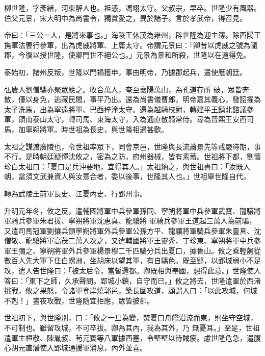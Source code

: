 
\begin{pinyinscope}

 柳世隆，字彥緒，河東解人也。祖憑，馮翊太守。父叔宗，早卒。世隆少有風器。伯父元景，宋大明中為尚書令，獨賞愛之，異於諸子。言於孝武帝，得召見。



 帝曰：「三公一人，是將來事也。」海陵王休茂為雍州，辟世隆為迎主簿。除西陽王撫軍法曹行參軍，出為虎威將軍、上庸太守。帝謂元景曰：「卿昔以虎威之號為隨郡，今復以授世隆，使卿門世不絕公也。」元景為景和所殺，世隆以在遠得免。



 泰始初，諸州反叛，世隆以門禍獲申，事由明帝，乃據郡起兵，遣使應朝廷。



 弘農人劉僧驎亦聚眾應之。收合萬人，奄至襄陽萬山，為孔道存所
 破，眾皆奔散，僅以身免，逃藏民間，事平乃出。還為尚書儀曹郎，明帝嘉其義心，發詔擢為太子洗馬，出為寧遠將軍、巴西梓潼太守。還為越騎校尉，轉建平王鎮北諮議參軍，領南泰山太守，轉司馬、東海太守，入為通直散騎常侍。尋為晉熙王安西司馬，加寧朔將軍。時世祖為長史，與世隆相遇甚歡。



 太祖之謀渡廣陵也，令世祖率眾下，同會京邑，世隆與長流蕭景先等戒嚴待期，事不行。是時朝廷疑憚沈攸之，密為之防，府州器械，皆有素蓄。世祖將下都，劉懷珍白太祖曰：「夏口是兵沖要地，宜得其人。」太祖納之，與世祖書曰：「汝既入朝，當須文武兼資人與汝意合者，委以後事，世隆其人也。」世祖舉世隆自代。



 轉為武陵王前軍長史、江夏內史、行郢州事。



 升明元年冬，攸之反，遣輔國將軍中兵參軍孫同、寧朔將軍中兵參軍武寶、龍驤將軍騎兵參軍朱君拔、寧朔將軍沈惠真、龍驤將
 軍騎兵參軍王道起三萬人為前驅，又遣司馬冠軍劉攘兵領寧朔將軍外兵參軍公孫方平、龍驤將軍騎兵參軍朱靈真、沈僧敬、龍驤將軍高茂二萬人次之，又遣輔國將軍王靈秀、丁珍東、寧朔將軍中兵參軍王彌之、寧朔將軍外兵參軍楊景穆二千匹騎分兵出夏口，據魯山。攸之乘輕舸從數百人先大軍下住白螺洲，坐胡床以望其軍，有自驕色。既至郢，以郢城弱小不足攻，遣人告世隆曰：「被太后令，當暫還都。卿既相與奉國，想得此意。」世隆使人答曰：「東下之師，久承聲問。郢城小鎮，自守而已。」攸之將去，世隆遣軍於西渚挑戰，攸之果怒，令諸軍登岸燒郭邑，築長圍攻道，顧謂人曰：「以此攻城，何城不剋！」晝夜攻戰，世隆隨宜拒應，眾皆披卻。



 世祖初下，與世隆別，曰：「攸之一旦為變，焚夏口舟艦沿流而東，則坐守空城，不可制也。雖留攻城，不可卒拔。卿為其內，我為其外，乃
 無憂耳。」至是，世祖遣軍主桓敬、陳胤叔、茍元賓等八軍據西塞，令堅壁以待賊疲。慮世隆危急，遣腹心胡元直潛使入郢城通援軍消息，內外並喜。




\end{pinyinscope}
